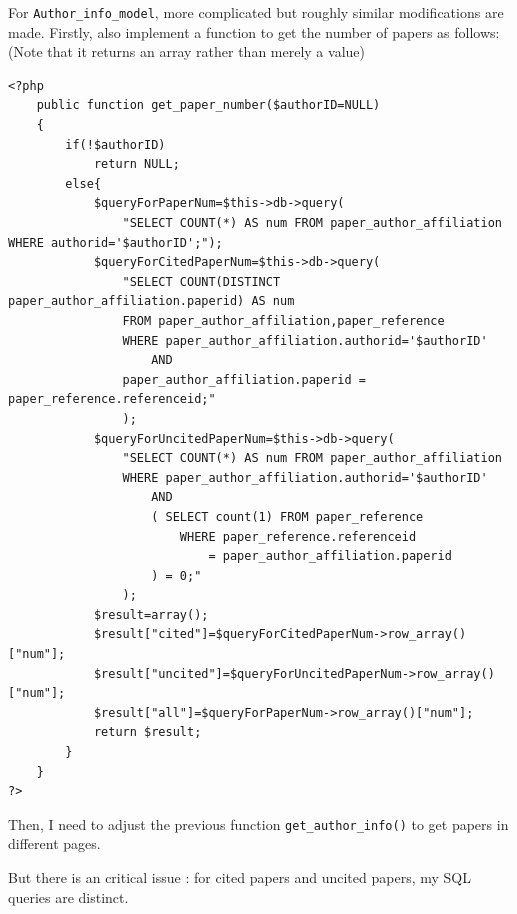 \documentclass[a4paper]{article}
\begin{document}
For \texttt{Author_info_model}, more complicated but roughly similar modifications are made. Firstly, also implement a function to get the number of papers as follows: (Note that it returns an array rather than merely a value)
\begin{verbatim}
<?php
    public function get_paper_number($authorID=NULL)
    {
        if(!$authorID)
            return NULL;
        else{
            $queryForPaperNum=$this->db->query(
                "SELECT COUNT(*) AS num FROM paper_author_affiliation WHERE authorid='$authorID';");
            $queryForCitedPaperNum=$this->db->query(
                "SELECT COUNT(DISTINCT paper_author_affiliation.paperid) AS num
                FROM paper_author_affiliation,paper_reference 
                WHERE paper_author_affiliation.authorid='$authorID' 
                    AND 
                paper_author_affiliation.paperid = paper_reference.referenceid;"
                );
            $queryForUncitedPaperNum=$this->db->query(
                "SELECT COUNT(*) AS num FROM paper_author_affiliation 
                WHERE paper_author_affiliation.authorid='$authorID' 
                    AND 
                    ( SELECT count(1) FROM paper_reference 
                        WHERE paper_reference.referenceid 
                            = paper_author_affiliation.paperid
                    ) = 0;"
                );
            $result=array();
            $result["cited"]=$queryForCitedPaperNum->row_array()["num"];    
            $result["uncited"]=$queryForUncitedPaperNum->row_array()["num"];
            $result["all"]=$queryForPaperNum->row_array()["num"];
            return $result;
        }
    }
?>
\end{verbatim}
Then, I need to adjust the previous function \texttt{get_author_info()} to get papers in different pages. 

But there is an critical issue : for cited papers and uncited papers, my SQL queries are distinct. 
\end{document}
